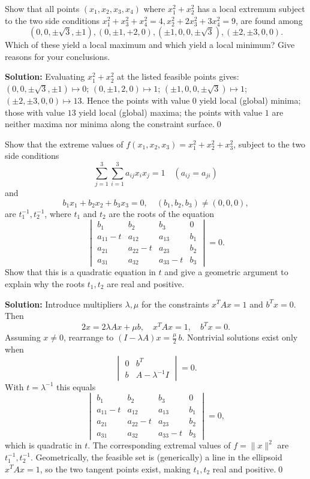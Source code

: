 \begin{problembox}
Show that all points \((x_1, x_2, x_3, x_4)\) where \(x_1^2 + x_2^2\) has a local extremum subject to the two side conditions \(x_1^2 + x_3^2 + x_4^2 = 4, x_2^2 + 2x_3^2 + 3x_4^2 = 9\), are found among 
\[ (0, 0, \pm \sqrt{3}, \pm 1), (0, \pm 1, +2, 0), (\pm 1, 0, 0, \pm \sqrt{3}), (\pm 2, \pm 3, 0, 0). \]
Which of these yield a local maximum and which yield a local minimum? Give reasons for your conclusions.
\end{problembox}

\bigskip\noindent\textbf{Solution:}
Evaluating $x_1^2+x_2^2$ at the listed feasible points gives: $(0,0,\pm\sqrt3,\pm1)\mapsto 0$; $(0,\pm1,2,0)\mapsto 1$; $(\pm1,0,0,\pm\sqrt3)\mapsto 1$; $(\pm2,\pm3,0,0)\mapsto 13$. Hence the points with value $0$ yield local (global) minima; those with value $13$ yield local (global) maxima; the points with value $1$ are neither maxima nor minima along the constraint surface.\qed


\begin{problembox}
Show that the extreme values of \(f(x_1, x_2, x_3) = x_1^2 + x_2^2 + x_3^2\), subject to the two side conditions
\[ \sum_{j=1}^3 \sum_{i=1}^3 a_{ij} x_i x_j = 1 \quad (a_{ij} = a_{ji}) \]
and
\[ b_1 x_1 + b_2 x_2 + b_3 x_3 = 0, \quad (b_1, b_2, b_3) \neq (0, 0, 0), \]
are \(t_1^{-1}, t_2^{-1}\), where \(t_1\) and \(t_2\) are the roots of the equation
\[\begin{vmatrix}
b_1 & b_2 & b_3 & 0 \\
a_{11} - t & a_{12} & a_{13} & b_1 \\
a_{21} & a_{22} - t & a_{23} & b_2 \\
a_{31} & a_{32} & a_{33} - t & b_3
\end{vmatrix} = 0.\]
Show that this is a quadratic equation in \(t\) and give a geometric argument to explain why the roots \(t_1, t_2\) are real and positive.
\end{problembox}

\bigskip\noindent\textbf{Solution:}
Introduce multipliers $\lambda,\mu$ for the constraints $x^{\!T}Ax=1$ and $b^{\!T}x=0$. Then
\[2x=2\lambda Ax+\mu b,\quad x^{\!T}Ax=1,\quad b^{\!T}x=0.
\]
Assuming $x\neq 0$, rearrange to $(I-\lambda A)x=\tfrac{\mu}{2}\,b$. Nontrivial solutions exist only when
\[\begin{vmatrix}
0 & b^{\!T} \\
b & A-\lambda^{-1}I
\end{vmatrix}=0.
\]
With $t=\lambda^{-1}$ this equals
\[\begin{vmatrix}
b_1 & b_2 & b_3 & 0 \\
a_{11} - t & a_{12} & a_{13} & b_1 \\
a_{21} & a_{22} - t & a_{23} & b_2 \\
a_{31} & a_{32} & a_{33} - t & b_3
\end{vmatrix}=0,
\]
which is quadratic in $t$. The corresponding extremal values of $f=\|x\|^2$ are $t_1^{-1}, t_2^{-1}$. Geometrically, the feasible set is (generically) a line in the ellipsoid $x^{\!T}Ax=1$, so the two tangent points exist, making $t_1,t_2$ real and positive.\qed



